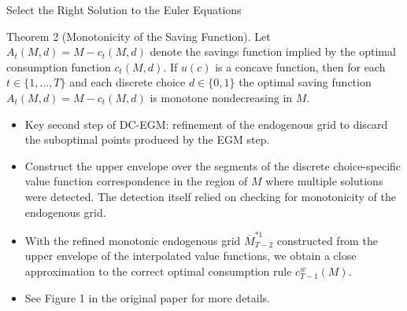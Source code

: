 \documentclass[aspectratio=169]{beamer}
\begin{document}
\begin{frame}{Select the Right Solution to the Euler Equations} \small
	\begin{theorem} \label{thm2}
		Theorem 2 (Monotonicity of the Saving Function). Let $A_t(M, d) = M - c_t(M, d)$ denote the savings function implied by the optimal consumption function $c_t(M, d)$. If $u(c)$ is a concave function, then for each $t \in \{1, \ldots, T\}$ and each discrete choice $d \in \{0,1\}$ the optimal saving function $A_t(M, d) = M - c_t(M, d)$ is monotone nondecreasing in $M$.
	\end{theorem}
	\begin{itemize}
		\item Key second step of DC-EGM: refinement of the endogenous grid to discard the suboptimal points produced by the EGM step.
		\item Construct the upper envelope over the segments of the discrete choice-specific value function correspondence in the region of $M$ where multiple solutions were detected. The detection itself relied on checking for monotonicity of the endogenous grid.
		\item With the refined monotonic endogenous grid $\overline{M}_{T-2}^{*1}$ constructed from the upper envelope of the interpolated value functions, we obtain a close approximation to the correct optimal consumption rule $c_{T-1}^w(M)$.
		\item See Figure 1 in the original paper for more details.
	\end{itemize}
\end{frame}
\end{document}
